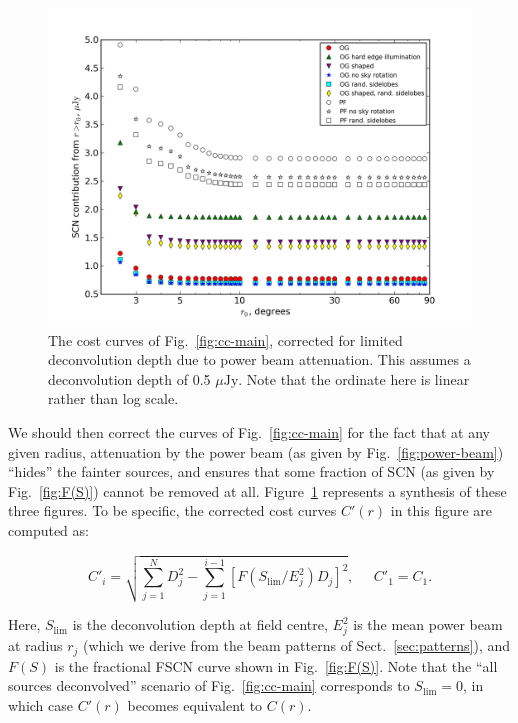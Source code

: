 \documentclass{aa}
\newcommand{\uJy}{$\mu\mathrm{Jy}$}
\begin{document}
\begin{figure}
\includegraphics[width=\columnwidth]{costcurve-main-asymptotic}
\caption{\label{fig:cc-main-asymptotic}The cost curves of Fig.~\ref{fig:cc-main}, corrected for limited deconvolution depth due to power beam attenuation. This assumes a deconvolution depth of 0.5 \uJy. Note that the ordinate here is linear rather than log scale.}
\end{figure}

We should then correct the curves of Fig.~\ref{fig:cc-main} for the fact that at any given radius, attenuation by the power beam (as given by Fig.~\ref{fig:power-beam}) ``hides'' the fainter sources, and ensures that some fraction of SCN (as given by Fig.~\ref{fig:F(S)}) cannot be removed at all. Figure~\ref{fig:cc-main-asymptotic} represents a synthesis of these three figures. To be specific, the corrected cost curves $C'(r)$ in this figure are computed as:

\[
  C'_i = \sqrt{ \sum_{j=1}^{N} D^2_j - \sum_{j=1}^{i-1} [F(S_\mathrm{lim}/E^2_j) D_j ]^2 }, \;\;\;\;\; C'_1=C_1.
\]

Here, $S_\mathrm{lim}$ is the deconvolution depth at field centre, $E^2_j$ is the mean power beam at radius $r_j$ (which we derive from the beam patterns of Sect.~\ref{sec:patterns}), and $F(S)$ is the fractional FSCN curve shown in Fig.~\ref{fig:F(S)}. Note that the ``all sources deconvolved'' scenario of Fig.~\ref{fig:cc-main} corresponds to $S_\mathrm{lim}=0$, in which case $C'(r)$ becomes equivalent to $C(r)$.
\end{document}
